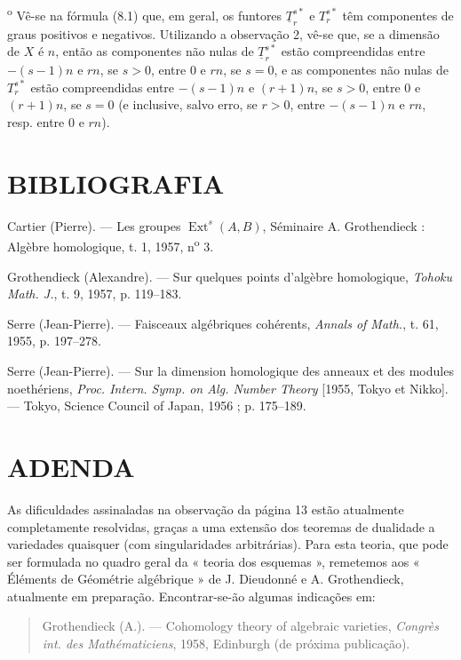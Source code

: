 \documentclass[11pt,twoside,openany]{book}
\numberwithin{equation}{section}
\newcommand{\src}[1]{%
  \phantomsection\hypertarget{src:#1}{}%
  \marginpar{\raggedleft\footnotesize\sffamily #1}%
}
\theoremstyle{plain}
\theoremstyle{definition}
\theoremstyle{remark}
\newcommand{\FgaUnitKey}{frontmatter}
\renewcommand{\src}[1]{%
  \phantomsection\hypertarget{src:\FgaUnitKey:#1}{}%
  \marginpar{\raggedleft\footnotesize\sffamily #1}%
}
\begin{document}
\medskip
{}\textsuperscript{o} Vê-se na fórmula (8.1) que, em geral, os
funtores $\underline{T}_{r}^{s*}$ e $T_{r}^{s*}$ têm componentes de
graus positivos e negativos. Utilizando a observação 2, vê-se que, se a
dimensão de $X$ é $n$, então as componentes não nulas de
$\underline{T}_{r}^{s*}$ estão compreendidas entre $-(s-1)n$ e $rn$, se $s>0$,
entre $0$ e $rn$, se $s=0$, e as componentes não nulas de $T_{r}^{s*}$
estão compreendidas entre $-(s-1)n$ e $(r+1)n$, se $s>0$, entre $0$ e $(r+1)n$,
se $s=0$ (e inclusive, salvo erro, se $r>0$, entre $-(s-1)n$ e $rn$, resp. entre
$0$ e $rn$).

\section*{BIBLIOGRAFIA}

\noindent[1] Cartier (Pierre). --- Les groupes
$\operatorname{Ext}^{s}(A,B)$, Séminaire A. Grothendieck : Algèbre homologique,
t. 1, 1957, n\textsuperscript{o} 3.

\noindent[2] Grothendieck (Alexandre). --- Sur quelques points d'algèbre
homologique, \emph{Tohoku Math. J.}, t. 9, 1957, p. 119--183.

\noindent[3] Serre (Jean-Pierre). --- Faisceaux algébriques cohérents,
\emph{Annals of Math.}, t. 61, 1955, p. 197--278.

\noindent[4] Serre (Jean-Pierre). --- Sur la dimension homologique des anneaux
et des modules noethériens, \emph{Proc. Intern. Symp. on Alg. Number Theory}
[1955, Tokyo et Nikko]. --- Tokyo, Science Council of Japan, 1956 ;
p. 175--189.

\clearpage
\src{193}
\section*{ADENDA}

As dificuldades assinaladas na observação da página 13 estão atualmente
completamente resolvidas, graças a uma extensão dos teoremas de dualidade a
variedades quaisquer (com singularidades arbitrárias). Para esta teoria, que pode
ser formulada no quadro geral da « teoria dos esquemas », remetemos
aos « Éléments de Géométrie algébrique » de J. Dieudonné e A. Grothendieck,
atualmente em preparação. Encontrar-se-ão algumas indicações em:

\begin{quote}
Grothendieck (A.). --- Cohomology theory of algebraic varieties,
\emph{Congrès int. des Mathématiciens}, 1958, Edinburgh (de próxima publicação).
\end{quote}
\end{document}
